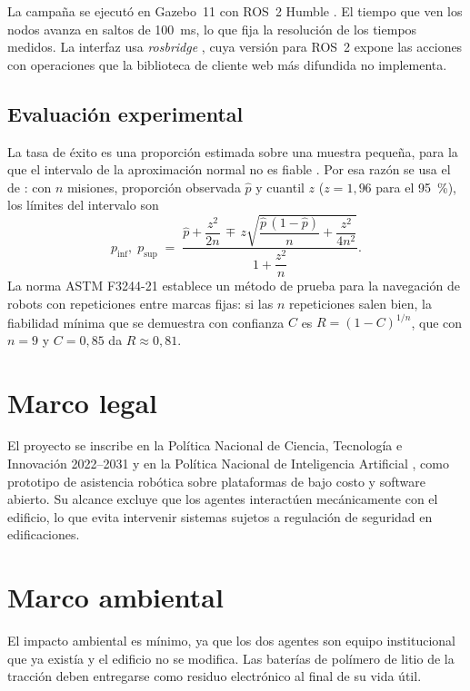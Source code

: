 La campaña se ejecutó en Gazebo~11 con ROS~2 Humble \autocite{koenig2004gazebo}. El tiempo que ven los nodos avanza en saltos de 100~ms, lo que fija la resolución de los tiempos medidos. La interfaz usa \textit{rosbridge} \autocite{crick2017rosbridge}, cuya versión para ROS~2 expone las acciones con operaciones que la biblioteca de cliente web más difundida no implementa.

\subsection{Evaluación experimental}

La tasa de éxito es una proporción estimada sobre una muestra pequeña, para la que el intervalo de la aproximación normal no es fiable \autocite{brown2001interval}. Por esa razón se usa el de \textcite{wilson1927probable}: con $n$ misiones, proporción observada $\hat{p}$ y cuantil $z$ ($z = 1{,}96$ para el 95~\%), los límites del intervalo son
\begin{equation}
  p_{\mathrm{inf}},\; p_{\mathrm{sup}} \;=\; \frac{\hat{p} + \dfrac{z^{2}}{2n} \,\mp\, z\sqrt{\dfrac{\hat{p}\,(1-\hat{p})}{n} + \dfrac{z^{2}}{4n^{2}}}}{1 + \dfrac{z^{2}}{n}} .
\end{equation}
La norma ASTM F3244-21 \autocite{astm2021f3244} establece un método de prueba para la navegación de robots con repeticiones entre marcas fijas: si las $n$ repeticiones salen bien, la fiabilidad mínima que se demuestra con confianza $C$ es $R = (1-C)^{1/n}$, que con $n = 9$ y $C = 0{,}85$ da $R \approx 0{,}81$.

\section{Marco legal}
\label{sec:legal}

El proyecto se inscribe en la Política Nacional de Ciencia, Tecnología e Innovación 2022--2031 \autocite{conpes4069} y en la Política Nacional de Inteligencia Artificial \autocite{conpes4144}, como prototipo de asistencia robótica sobre plataformas de bajo costo y software abierto. Su alcance excluye que los agentes interactúen mecánicamente con el edificio, lo que evita intervenir sistemas sujetos a regulación de seguridad en edificaciones.

\section{Marco ambiental}
\label{sec:ambiental}

El impacto ambiental es mínimo, ya que los dos agentes son equipo institucional que ya existía y el edificio no se modifica. Las baterías de polímero de litio de la tracción deben entregarse como residuo electrónico al final de su vida útil.
